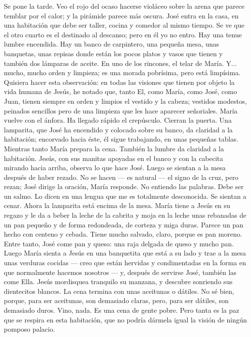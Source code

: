 \documentclass[12pt]{book} %
\begin{document}
Se pone la tarde. Veo el rojo del ocaso hacerse violáceo sobre la arena que parece temblar por el calor; y la pirámide 
parece más oscura. 
José entra en la casa, en una habitación que debe ser taller, cocina y comedor al mismo tiempo. Se ve que el otro cuarto 
es el destinado al descanso; pero en él yo no entro. Hay una tenue lumbre encendida. Hay un banco de carpintero, una pequeña mesa, unas banquetas, unas repisas donde están los pocos platos y vasos que tienen y también dos lámparas de aceite. En uno de los rincones, el telar de María. Y... mucho, mucho orden y limpieza; es una morada pobrísima, pero está limpísima.                   
Quisiera hacer esta observación: en todas las visiones que tienen por objeto la vida humana de Jesús, he notado que, 
tanto El, como María, como José, como Juan, tienen siempre en orden y limpios el vestido y la cabeza; vestidos modestos, peinados sencillos pero de una limpieza que les hace aparecer señoriales. 
María vuelve con el ánfora. Ha llegado rápido el crepúsculo. Cierran la puerta. Una lamparita, que José ha encendido y colocado sobre su banco, da claridad a la habitación; encorvado hacia éste, él sigue trabajando, en unas pequeñas tablas. Mientras tanto María prepara la cena. También la lumbre da claridad a la habitación. Jesús, con sus manitas apoyadas en el banco y con la cabecita mirando hacia arriba, observa lo que hace José. 
Luego se sientan a la mesa después de haber rezado. No se hacen — es natural — el signo de la cruz, pero rezan; José dirige la oración, María responde. No entiendo las palabras. Debe ser un salmo. Lo dicen en una lengua que me es totalmente desconocida. 
Se sientan a cenar. Ahora la lamparita está encima de la mesa. María tiene a Jesús en su regazo y le da a beber la leche de la cabrita y moja en la leche unas rebanadas de un pan pequeño y de forma redondeada, de corteza y miga duras. Parece un pan hecho con centeno y cebada. Tiene mucho salvado, claro, porque es pan moreno. Entre tanto, José come pan y queso: una raja delgada de queso y mucho pan. Luego María sienta a Jesús en una banquetita que está a su lado y trae a la mesa unas verduras cocidas — creo que están hervidas y condimentadas en la forma en que normalmente hacemos nosotros — y, después de servirse José, también las come Ella. Jesús mordisquea tranquilo su manzana, y descubre sonriendo sus dientecitos blancos. La cena termina con unas aceitunas o dátiles. No sé bien, porque, para ser aceitunas, son demasiado claras, pero, para ser dátiles, son demasiado duros. Vino, nada. Es una cena de gente pobre.                 
Pero tanta es la paz que se respira en esta habitación, que no podría dármela igual la visión de ningún pomposo palacio. 
\end{document}
